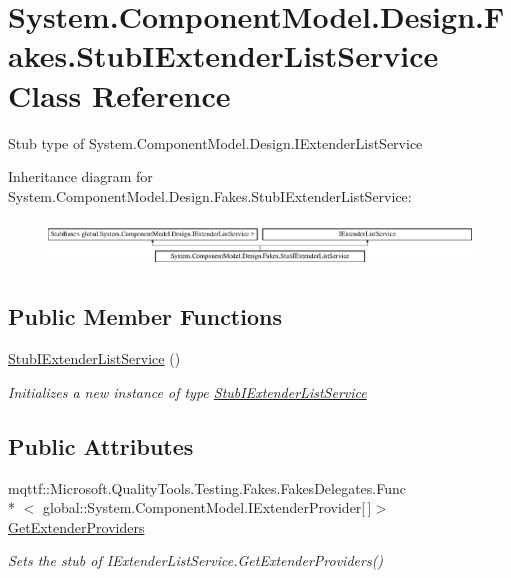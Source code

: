 \hypertarget{class_system_1_1_component_model_1_1_design_1_1_fakes_1_1_stub_i_extender_list_service}{\section{System.\-Component\-Model.\-Design.\-Fakes.\-Stub\-I\-Extender\-List\-Service Class Reference}
\label{class_system_1_1_component_model_1_1_design_1_1_fakes_1_1_stub_i_extender_list_service}
}


Stub type of System.\-Component\-Model.\-Design.\-I\-Extender\-List\-Service 


Inheritance diagram for System.\-Component\-Model.\-Design.\-Fakes.\-Stub\-I\-Extender\-List\-Service\-:\begin{figure}[H]
\begin{center}
\leavevmode
\includegraphics[height=1.272727cm]{class_system_1_1_component_model_1_1_design_1_1_fakes_1_1_stub_i_extender_list_service}
\end{center}
\end{figure}
\subsection*{Public Member Functions}
\begin{DoxyCompactItemize}
\item 
\hyperlink{class_system_1_1_component_model_1_1_design_1_1_fakes_1_1_stub_i_extender_list_service_a014f1e13e7ec11c843b9f1b2d0846624}{Stub\-I\-Extender\-List\-Service} ()
\begin{DoxyCompactList}\small\item\em Initializes a new instance of type \hyperlink{class_system_1_1_component_model_1_1_design_1_1_fakes_1_1_stub_i_extender_list_service}{Stub\-I\-Extender\-List\-Service}\end{DoxyCompactList}\end{DoxyCompactItemize}
\subsection*{Public Attributes}
\begin{DoxyCompactItemize}
\item 
mqttf\-::\-Microsoft.\-Quality\-Tools.\-Testing.\-Fakes.\-Fakes\-Delegates.\-Func\\*
$<$ global\-::\-System.\-Component\-Model.\-I\-Extender\-Provider\mbox{[}$\,$\mbox{]}$>$ \hyperlink{class_system_1_1_component_model_1_1_design_1_1_fakes_1_1_stub_i_extender_list_service_a85667565b87ee8d71f5e9a72213b7243}{Get\-Extender\-Providers}
\begin{DoxyCompactList}\small\item\em Sets the stub of I\-Extender\-List\-Service.\-Get\-Extender\-Providers()\end{DoxyCompactList}\end{DoxyCompactItemize}


